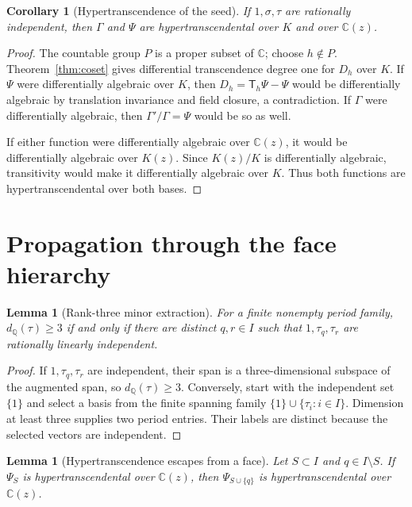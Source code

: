 \documentclass[11pt]{article}
\numberwithin{equation}{section}
\newtheorem{lemma}[theorem]{Lemma}
\newtheorem{corollary}[theorem]{Corollary}
\theoremstyle{definition}
\theoremstyle{remark}
\newcommand{\C}{\mathbb C}
\newcommand{\Q}{\mathbb Q}
\newcommand{\T}{\mathsf T}
\begin{document}
\begin{corollary}[Hypertranscendence of the seed]
\label{cor:seed}
If $1,\sigma,\tau$ are rationally independent, then $\Gamma$ and $\Psi$ are
hypertranscendental over $K$ and over $\C(z)$.
\end{corollary}

\begin{proof}
The countable group $P$ is a proper subset of $\C$; choose $h\notin P$.
Theorem~\ref{thm:coset} gives differential transcendence degree one for
$D_h$ over $K$.  If $\Psi$ were differentially algebraic over $K$, then
$D_h=\T_h\Psi-\Psi$ would be differentially algebraic by translation
invariance and field closure, a contradiction.  If $\Gamma$ were
differentially algebraic, then $\Gamma'/\Gamma=\Psi$ would be so as well.

If either function were differentially algebraic over $\C(z)$, it would be
differentially algebraic over $K(z)$.  Since $K(z)/K$ is differentially
algebraic, transitivity would make it differentially algebraic over $K$.
Thus both functions are hypertranscendental over both bases.
\end{proof}

\section{Propagation through the face hierarchy}
\label{sec:propagation}

\begin{lemma}[Rank-three minor extraction]
\label{lem:minor}
For a finite nonempty period family,
$d_\Q(\tau)\geq3$ if and only if there are distinct $q,r\in I$ such that
$1,\tau_q,\tau_r$ are rationally linearly independent.
\end{lemma}

\begin{proof}
If $1,\tau_q,\tau_r$ are independent, their span is a three-dimensional
subspace of the augmented span, so $d_\Q(\tau)\geq3$.  Conversely, start
with the independent set
$\{1\}$ and select a basis from the finite spanning family
$\{1\}\cup\{\tau_i:i\in I\}$.  Dimension at least three supplies two
period entries.  Their labels are distinct because the selected vectors are
independent.
\end{proof}

\begin{lemma}[Hypertranscendence escapes from a face]
\label{lem:escape}
Let $S\subset I$ and $q\in I\setminus S$.  If $\Psi_S$ is
hypertranscendental over $\C(z)$, then $\Psi_{S\cup\{q\}}$ is
hypertranscendental over $\C(z)$.
\end{lemma}
\end{document}

